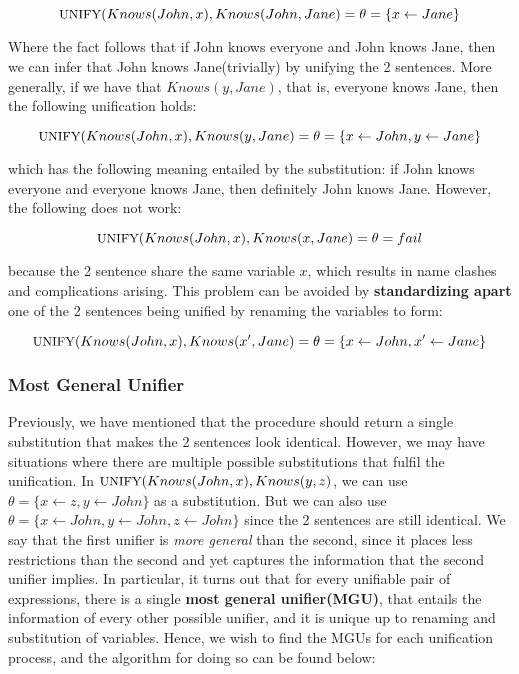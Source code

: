 \documentclass[12pt]{article}
\begin{document}
\begin{equation*}
\text{\small{UNIFY}} (Knows(John, x), Knows(John, Jane) = \theta = \{ x \leftarrow Jane \}
\end{equation*}

Where the fact follows that if John knows everyone and John knows Jane, then we can infer that John knows Jane(trivially) by unifying the 2 sentences. More generally, if we have that $Knows(y, Jane)$, that is, everyone knows Jane, then the following unification holds:

\begin{equation*}
\text{\small{UNIFY}} (Knows(John, x), Knows(y, Jane) = \theta = \{ x \leftarrow John, y \leftarrow Jane \}
\end{equation*}

which has the following meaning entailed by the substitution: if John knows everyone and everyone knows Jane, then definitely John knows Jane. However, the following does not work:

\begin{equation*}
\text{\small{UNIFY}} (Knows(John, x), Knows(x, Jane) = \theta = fail
\end{equation*}

because the 2 sentence share the same variable $x$, which results in name clashes and complications arising. This problem can be avoided by \textbf{standardizing apart} one of the 2 sentences being unified by renaming the variables to form:

\begin{equation*}
\text{\small{UNIFY}} (Knows(John, x), Knows(x', Jane) = \theta = \{ x \leftarrow John, x' \leftarrow Jane \}
\end{equation*}

\subsubsection{Most General Unifier}

Previously, we have mentioned that the  procedure should return a single substitution that makes the 2 sentences look identical. However, we may have situations where there are multiple possible substitutions that fulfil the unification. In $\text{\small{UNIFY}} (Knows(John, x), Knows(y, z)$, we can use $\theta = \{ x \leftarrow z, y \leftarrow John \}$ as a substitution. But we can also use $\theta = \{x \leftarrow John, y \leftarrow John, z \leftarrow John \}$ since the 2 sentences are still identical. We say that the first unifier is \textit{more general} than the second, since it places less restrictions than the second and yet captures the information that the second unifier implies. In particular, it turns out that for every unifiable pair of expressions, there is a single \textbf{most general unifier(MGU)}, that entails the information of every other possible unifier, and it is unique up to renaming and substitution of variables. Hence, we wish to find the MGUs for each unification process, and the algorithm for doing so can be found below:
\end{document}
